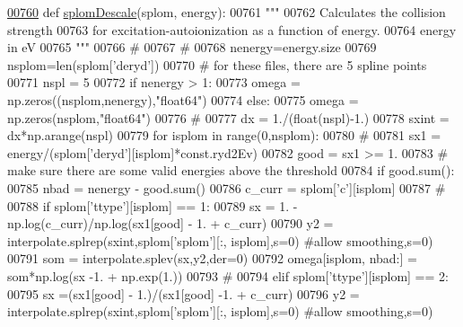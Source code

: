 \begin{DoxyCode}
\hypertarget{namespacepyneb_1_1utils_1_1__chianti__tools_l00760}{}\hyperlink{namespacepyneb_1_1utils_1_1__chianti__tools_a391eb09a09769234e5759d5544d0bcaf}{00760} \textcolor{keyword}{def }\hyperlink{namespacepyneb_1_1utils_1_1__chianti__tools_a391eb09a09769234e5759d5544d0bcaf}{splomDescale}(splom, energy):
00761     \textcolor{stringliteral}{"""}
00762 \textcolor{stringliteral}{    Calculates the collision strength}
00763 \textcolor{stringliteral}{    for excitation-autoionization as a function of energy.}
00764 \textcolor{stringliteral}{    energy in eV}
00765 \textcolor{stringliteral}{    """}
00766     \textcolor{comment}{#}
00767     \textcolor{comment}{#}
00768     nenergy=energy.size
00769     nsplom=len(splom[\textcolor{stringliteral}{'deryd'}])
00770     \textcolor{comment}{# for these files, there are 5 spline points}
00771     nspl = 5
00772     \textcolor{keywordflow}{if} nenergy > 1:
00773         omega = np.zeros((nsplom,nenergy),\textcolor{stringliteral}{"float64"})
00774     \textcolor{keywordflow}{else}:
00775         omega = np.zeros(nsplom,\textcolor{stringliteral}{"float64"})
00776     \textcolor{comment}{#}
00777     dx = 1./(float(nspl)-1.)
00778     sxint = dx*np.arange(nspl)
00779     \textcolor{keywordflow}{for} isplom \textcolor{keywordflow}{in} range(0,nsplom):
00780         \textcolor{comment}{#}
00781         sx1 = energy/(splom[\textcolor{stringliteral}{'deryd'}][isplom]*const.ryd2Ev)
00782         good = sx1 >= 1.
00783         \textcolor{comment}{# make sure there are some valid energies above the threshold}
00784         \textcolor{keywordflow}{if} good.sum():
00785             nbad = nenergy - good.sum()
00786             c\_curr = splom[\textcolor{stringliteral}{'c'}][isplom]
00787             \textcolor{comment}{#}
00788             \textcolor{keywordflow}{if} splom[\textcolor{stringliteral}{'ttype'}][isplom] == 1:
00789                 sx = 1. - np.log(c\_curr)/np.log(sx1[good] - 1. + c\_curr)
00790                 y2 = interpolate.splrep(sxint,splom[\textcolor{stringliteral}{'splom'}][:, isplom],s=0)  \textcolor{comment}{#allow smoothing,s=0)}
00791                 som = interpolate.splev(sx,y2,der=0)
00792                 omega[isplom, nbad:] = som*np.log(sx -1. + np.exp(1.))
00793             \textcolor{comment}{#}
00794             \textcolor{keywordflow}{elif} splom[\textcolor{stringliteral}{'ttype'}][isplom] == 2:
00795                 sx =(sx1[good] - 1.)/(sx1[good] -1. + c\_curr)
00796                 y2 = interpolate.splrep(sxint,splom[\textcolor{stringliteral}{'splom'}][:, isplom],s=0)  \textcolor{comment}{#allow smoothing,s=0)}

\end{DoxyCode}
